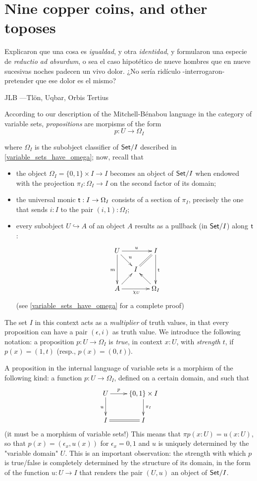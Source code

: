\section{Nine copper coins, and other toposes}\label{sec_coins}
\epigraph{
	Explicaron que una cosa es \emph{igualdad}, y otra \emph{identidad}, y formularon una especie de \emph{reductio ad absurdum}, o sea el caso hipotético de nueve hombres que en nueve sucesivas noches padecen un vivo dolor. ¿No sería ridículo -interrogaron- pretender que ese dolor es el mismo?
}{JLB ---Tl\"on, Uqbar, Orbis Tertius}

According to our description of the Mitchell-Bénabou language in the category of variable sets, \emph{propositions} are morpisms of the form
\[p : U \to \Omega_I\]

where $\Omega_I$ is the subobject classifier of $\mathsf{Set}/I$ described in \autoref{variable_sets_have_omega}; now, recall that
\begin{itemize}
	\item the object $\Omega_I = \{0,1\}\times I \to I$ becomes an object of $\mathsf{Set}/I$ when endowed with the projection $\pi_I : \Omega_I \to I$ on the second factor of its domain;
	\item the universal monic $\textsf{t} : I \to \Omega_I$ consists of a section of $\pi_I$, precisely the one that sends $i : I$ to the pair $(i,1) : \Omega_I$;
	\item every subobject $U \hookrightarrow A$ of an object $A$ results as a pullback (in $\mathsf{Set}/I$) along $\textsf{t}$:
	      \[\xymatrix@R=5mm@C=5mm{
		      U\ar[dr]^u\ar[rr]^u\ar[dd]_m&& I\ar[dd]^{\tr} \ar@{=}[dl]\\
		      &I& \\
		      A \ar[ur]\ar[rr]_{\chi_U}&& \ar[ul]\Omega_I
		      }\]
	      (see \autoref{variable_sets_have_omega} for a complete proof)
\end{itemize}
The set $I$ in this context acts as a \emph{multiplier} of truth values, in that every proposition can have a pair $(\epsilon, i)$ as truth value. We introduce the following notation: a proposition $p : U \to \Omega_I$ is \emph{true}, in context $x :U$, with \emph{strength} $t$, if $p(x) =(1,t)$ (resp., $p(x)=(0,t)$).
\begin{remark}\label{very_importanta_force}
A proposition in the internal language of variable sets is a morphism of the following kind: a function $p : U \to \Omega_I$, defined on a certain domain, and such that
\[
	\xymatrix{
		U\ar[d]_u\ar[r]^-p  & \{0,1\}\times I \ar[d]^{\pi_I}\\
		I \ar@{=}[r]& I
	}
\]
(it must be a morphism of variable sets!) This means that $\pi p(x : U) = u(x : U)$, so that $p(x) = (\epsilon_x, u(x))$ for $\epsilon_x =0,1$ and $u$ is uniquely determined by the "variable domain" $U$. This is an important observation: the strength with which $p$ is true/false is completely determined by the structure of its domain, in the form of the function $u : U \to I$ that renders the pair $(U,u)$ an object of $\mathsf{Set}/I$.
\end{remark}

